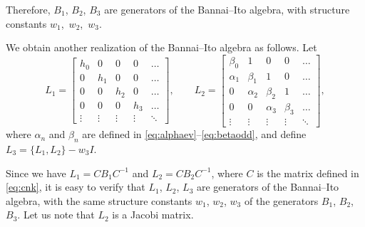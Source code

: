 \documentclass[10pt,a4paper]{amsart}
\numberwithin{equation}{section}
\begin{document}
	Therefore, $B_1$, $B_2$, $B_3$ are generators of the Bannai--Ito algebra, with structure constants $w_1$,~$w_2$,~$w_3$.

We obtain another realization of the Bannai--Ito algebra as follows. Let
\begin{equation*}%
 L_1= \begin{bmatrix} h_0 & 0 & 0 & 0 & \dots \\
   0  & h_1 & 0 & 0 & \dots \\
     0 & 0  & h_2  & 0 & \dots \\
       0 & 0 & 0  & h_3 & \dots \\
   \vdots  & \vdots  & \vdots  & \vdots  &  \ddots  \end{bmatrix}, \qquad
 L_2 = \begin{bmatrix} \beta_0 & 1 & 0 & 0 & \dots \\
       \alpha_1 & \beta_1 & 1 & 0 & \dots \\
      0 & \alpha_2 & \beta_2  & 1 & \dots \\
      0 & 0 & \alpha_3 & \beta_3 & \dots \\
 \vdots  & \vdots  & \vdots  & \vdots  &  \ddots  \end{bmatrix}, \end{equation*}
	where $\alpha_n$ and $\beta_n$ are defined in \eqref{eq:alphaev}--\eqref{eq:betaodd},
	and define $L_3=\{L_1,L_2\} - w_3 I$.

	Since we have $L_1=C B_1 C^{-1}$ and $L_2= C B_2 C^{-1}$, where $C$ is the matrix defined in \eqref{eq:cnk},
 it is easy to verify that $L_1$, $L_2$, $L_3$ are generators of the Bannai--Ito algebra, with the same structure constants $w_1$, $w_2$, $w_3$ of the generators $B_1$, $B_2$, $B_3$. Let us note that $L_2$ is a Jacobi matrix.
\end{document}
